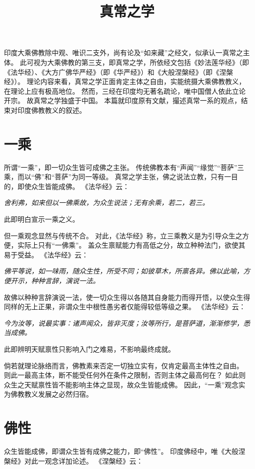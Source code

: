 \documentclass[11pt]{article}
\title{真常之学}
\date{}
\begin{document}
  \maketitle

  \linenumbers

印度大乘佛教除中观、唯识二支外，尚有论及“如来藏”之经文，似承认一真常之主体。
此可视为大乘佛教的第三支，即真常之学，所依经文包括《妙法莲华经》（即《法华经）、《大方广佛华严经》（即《华严经》）和《大般涅槃经》（即《涅槃经》）。
理论内容来看，真常之学正面肯定主体之自由，实能统摄大乘佛教教义，在理论上应有极高地位。
然而，三经在印度均无著名疏论，唯中国僧人依此立论开宗。
故真常之学独盛于中国。
本篇就印度原有文献，撮述真常一系的观点，结束对印度佛教教义的叙述。

\section{一乘}
所谓“一乘”，即一切众生皆可成佛之主张。
传统佛教本有“声闻”“缘觉”“菩萨”三乘，而以“佛”和“菩萨”为同一等级。
真常之学主张，佛之说法立教，只有一目的，即使众生皆能成佛。
《法华经》云：

\textit{舍利弗，如来但以一佛乘故，为众生说法；无有余乘，若二，若三。}

此即明白宣示一乘之义。

\newline

但一乘观念显然与传统不合。
对此，《法华经》称，立三乘教义是为引导众生之方便，实际上只有“一佛乘”。
盖众生禀赋能力有高低之分，故立种种法门，欲使其易于受益。
《法华经》云：

\textit{佛平等说，如一味雨，随众生性，所受不同；如彼草木，所禀各异。佛以此喻，方便开示，种种言辞，演说一法。}

故佛以种种言辞演说一法，使一切众生得以各随其自身能力而得开悟，以使众生得同样的无上正果，非谓众生中根性愚劣者仅能得较低等级之果。
《法华经》云：

\textit{今为汝等，说最实事：诸声闻众，皆非灭度；汝等所行，是菩萨道，渐渐修学，悉当成佛。}

此即辨明天赋禀性只影响入门之难易，不影响最终成就。

\newline

倘若就理论脉络而言，佛教素来否定一切独立实有，仅肯定最高主体性之自由。
则此一最高主体，断不能受任何外在条件之限制，否则主体之最高何在？
如此则众生之天赋禀性皆不能影响主体之显现，故众生皆能成佛。
因此，“一乘”观念实为佛教教义发展之必然归宿。

\section{佛性}
众生皆能成佛，即谓众生皆有成佛之能力，即“佛性”。
印度佛经中，唯《大般涅槃经》对此一观念详加论述。
《涅槃经》云：
\end{document}
